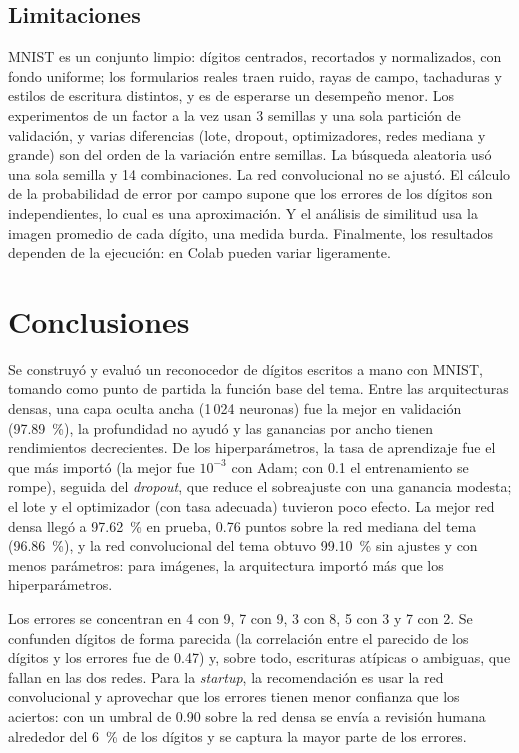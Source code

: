 \documentclass[11pt,letterpaper]{article}
\begin{document}
\subsection{Limitaciones}

MNIST es un conjunto limpio: dígitos centrados, recortados y normalizados, con fondo uniforme; los formularios reales traen ruido, rayas de campo, tachaduras y estilos de escritura distintos, y es de esperarse un desempeño menor. Los experimentos de un factor a la vez usan 3 semillas y una sola partición de validación, y varias diferencias (lote, dropout, optimizadores, redes mediana y grande) son del orden de la variación entre semillas. La búsqueda aleatoria usó una sola semilla y 14 combinaciones. La red convolucional no se ajustó. El cálculo de la probabilidad de error por campo supone que los errores de los dígitos son independientes, lo cual es una aproximación. Y el análisis de similitud usa la imagen promedio de cada dígito, una medida burda. Finalmente, los resultados dependen de la ejecución: en Colab pueden variar ligeramente.

\section{Conclusiones}

Se construyó y evaluó un reconocedor de dígitos escritos a mano con MNIST, tomando como punto de partida la función base del tema. Entre las arquitecturas densas, una capa oculta ancha (1\,024 neuronas) fue la mejor en validación (97.89~\%), la profundidad no ayudó y las ganancias por ancho tienen rendimientos decrecientes. De los hiperparámetros, la tasa de aprendizaje fue el que más importó (la mejor fue $10^{-3}$ con Adam; con 0.1 el entrenamiento se rompe), seguida del \textit{dropout}, que reduce el sobreajuste con una ganancia modesta; el lote y el optimizador (con tasa adecuada) tuvieron poco efecto. La mejor red densa llegó a 97.62~\% en prueba, 0.76 puntos sobre la red mediana del tema (96.86~\%), y la red convolucional del tema obtuvo 99.10~\% sin ajustes y con menos parámetros: para imágenes, la arquitectura importó más que los hiperparámetros.

Los errores se concentran en 4 con 9, 7 con 9, 3 con 8, 5 con 3 y 7 con 2. Se confunden dígitos de forma parecida (la correlación entre el parecido de los dígitos y los errores fue de 0.47) y, sobre todo, escrituras atípicas o ambiguas, que fallan en las dos redes. Para la \textit{startup}, la recomendación es usar la red convolucional y aprovechar que los errores tienen menor confianza que los aciertos: con un umbral de 0.90 sobre la red densa se envía a revisión humana alrededor del 6~\% de los dígitos y se captura la mayor parte de los errores.

\end{document}
